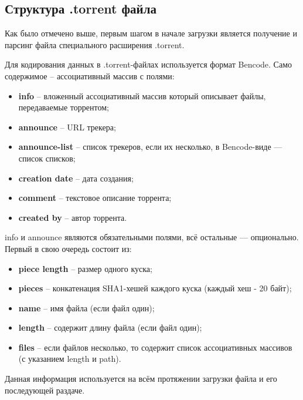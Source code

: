 \subsection{Структура .torrent файла}
Как было отмечено выше, первым шагом в начале загрузки является получение и парсинг файла специального расширения .torrent.

Для кодирования данных в .torrent-файлах используется формат Bencode. Само содержимое -- ассоциативный массив с полями:
\begin{itemize}
	\item \textbf{info} -- вложенный ассоциативный массив который описывает файлы, передаваемые торрентом;
	
	\item \textbf{announce} -- URL трекера;
	
	\item \textbf{announce-list} -- список трекеров, если их несколько, в Bencode-виде — список списков;
	
	\item \textbf{creation date} -- дата создания;
	
	\item \textbf{comment} -- текстовое описание торрента;
	
	\item \textbf{created by} -- автор торрента. \\
\end{itemize}

info и announce являются обязательными полями, всё остальные — опционально. Первый в свою очередь состоит из:
\begin{itemize}
	\item \textbf{piece length} -- размер одного куска;
	
	\item \textbf{pieces} -- конкатенация SHA1-хешей каждого куска (каждый хеш - 20 байт);
	
	\item \textbf{name} -- имя файла (если файл один);
	
	\item \textbf{length} -- содержит длину файла (если файл один);
	
	\item \textbf{files} -- если файлов несколько, то содержит список ассоциативных массивов (с указанием length и path). \\
\end{itemize}

Данная информация используется на всём протяжении загрузки файла и его последующей раздаче. \newline

